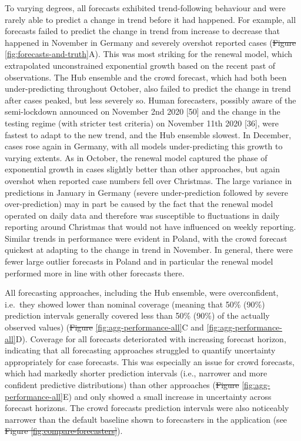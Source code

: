 \documentclass[10pt,letterpaper]{article}
\providecommand{\DIFaddtex}[1]{{\protect\color{blue}\uwave{#1}}} %
\providecommand{\DIFdeltex}[1]{{\protect\color{red}\sout{#1}}}                      %
\providecommand{\DIFaddbegin}{} %
\providecommand{\DIFaddend}{} %
\providecommand{\DIFdelbegin}{} %
\providecommand{\DIFdelend}{} %
\providecommand{\DIFadd}[1]{\texorpdfstring{\DIFaddtex{#1}}{#1}} %
\providecommand{\DIFdel}[1]{\texorpdfstring{\DIFdeltex{#1}}{}} %
\newcommand{\DIFscaledelfig}{0.5}
\newlength{\DIFdelgraphicswidth} %
\newlength{\DIFdelgraphicsheight} %
\newcommand{\DIFaddincludegraphics}[2][]{{\color{blue}\fbox{\DIFOincludegraphics[#1]{#2}}}} %
\newcommand{\DIFdelincludegraphics}[2][]{%
\sbox{\DIFdelgraphicsbox}{\DIFOincludegraphics[#1]{#2}}%
\settoboxwidth{\DIFdelgraphicswidth}{\DIFdelgraphicsbox} %
\settoboxtotalheight{\DIFdelgraphicsheight}{\DIFdelgraphicsbox} %
\scalebox{\DIFscaledelfig}{%
\parbox[b]{\DIFdelgraphicswidth}{\usebox{\DIFdelgraphicsbox}\\[-\baselineskip] \rule{\DIFdelgraphicswidth}{0em}}\llap{\resizebox{\DIFdelgraphicswidth}{\DIFdelgraphicsheight}{%
\setlength{\unitlength}{\DIFdelgraphicswidth}%
\begin{picture}(1,1)%
\thicklines\linethickness{2pt} %
{\color[rgb]{1,0,0}\put(0,0){\framebox(1,1){}}}%
{\color[rgb]{1,0,0}\put(0,0){\line( 1,1){1}}}%
{\color[rgb]{1,0,0}\put(0,1){\line(1,-1){1}}}%
\end{picture}%
}\hspace*{3pt}}} %
} %
\DeclareRobustCommand{\DIFaddbegin}{\DIFOaddbegin \let\includegraphics\DIFaddincludegraphics} %
\DeclareRobustCommand{\DIFaddend}{\DIFOaddend \let\includegraphics\DIFOincludegraphics} %
\DeclareRobustCommand{\DIFdelbegin}{\DIFOdelbegin \let\includegraphics\DIFdelincludegraphics} %
\DeclareRobustCommand{\DIFdelend}{\DIFOaddend \let\includegraphics\DIFOincludegraphics} %
\begin{document}
To varying degrees, all forecasts exhibited trend-following behaviour
and were rarely able to predict a change in trend before it had
happened. For example, all forecasts failed to predict the change in
trend from increase to decrease that happened in November in Germany and
severely overshot reported cases (\DIFdelbegin \DIFdel{Figure
}\DIFdelend \DIFaddbegin \DIFadd{Fig }\DIFaddend \ref{fig:forecasts-and-truth}A).
This was most striking for the renewal model, which extrapolated
unconstrained exponential growth based on the recent past of
observations. The Hub ensemble and the crowd forecast, which had both
been under-predicting throughout October, also failed to predict the
change in trend after cases peaked, but less severely so. Human
forecasters, possibly aware of the semi-lockdown announced on November
2nd 2020 {[}50{]} and the change in the testing regime (with stricter
test criteria) on November 11th 2020 {[}36{]}, were fastest to adapt to
the new trend, and the Hub ensemble slowest. In December, cases rose
again in Germany, with all models under-predicting this growth to
varying extents. As in October, the renewal model captured the phase of
exponential growth in cases slightly better than other approaches, but
again overshot when reported case numbers fell over Christmas. The large
variance in predictions in January in Germany (severe under-prediction
followed by severe over-prediction) may in part be caused by the fact
that the renewal model operated on daily data and therefore was
susceptible to fluctuations in daily reporting around Christmas that
would not have influenced on weekly reporting. Similar trends in
performance were evident in Poland, with the crowd forecast quickest at
adapting to the change in trend in November. In general, there were
fewer large outlier forecasts in Poland and in particular the renewal
model performed more in line with other forecasts there.

All forecasting approaches, including the Hub ensemble, were
overconfident, i.e.~they showed lower than nominal coverage (meaning
that 50\% (90\%) prediction intervals generally covered less than 50\%
(90\%) of the actually observed values) (\DIFdelbegin \DIFdel{Figure
}\DIFdelend \DIFaddbegin \DIFadd{Fig
}\DIFaddend \ref{fig:agg-performance-all}C and \ref{fig:agg-performance-all}D).
Coverage for all forecasts deteriorated with increasing forecast
horizon, indicating that all forecasting approaches struggled to
quantify uncertainty appropriately for case forecasts. This was
especially an issue for crowd forecasts, which had markedly shorter
prediction intervals (i.e., narrower and more confident predictive
distributions) than other approaches (\DIFdelbegin \DIFdel{Figure
}\DIFdelend \DIFaddbegin \DIFadd{Fig
}\DIFaddend \ref{fig:agg-performance-all}E) and only showed a small increase in
uncertainty across forecast horizons. The crowd forecasts prediction
intervals were also noticeably narrower than the default baseline shown
to forecasters in the application (see
\DIFdelbegin \DIFdel{Figure
\ref{fig:compare-forecasters}}\DIFdelend \DIFaddbegin {}\DIFaddend ).
\end{document}
